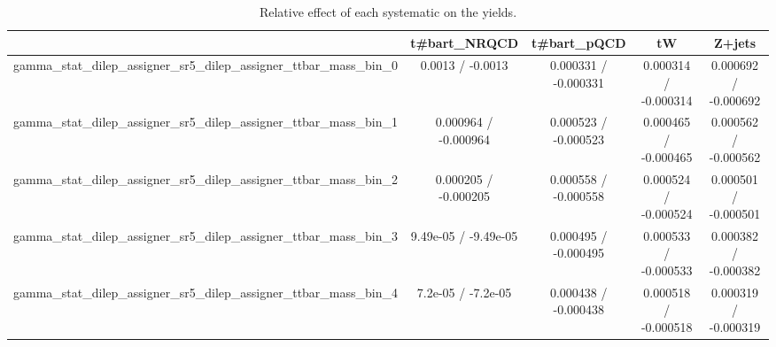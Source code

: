 \documentclass[10pt]{article}
\begin{document}
\begin{table}[htbp]
\begin{center}
\begin{tabular}{|c|c|c|c|c|}
\hline 
      & t#bar{t}_{NRQCD}      & t#bar{t}_{pQCD}      & tW      & Z+jets \\ 
\hline 
  gamma_stat_dilep_assigner_sr5_dilep_assigner_ttbar_mass_bin_0 & 0.0013 / -0.0013 & 0.000331 / -0.000331 & 0.000314 / -0.000314 & 0.000692 / -0.000692 \\ 
  gamma_stat_dilep_assigner_sr5_dilep_assigner_ttbar_mass_bin_1 & 0.000964 / -0.000964 & 0.000523 / -0.000523 & 0.000465 / -0.000465 & 0.000562 / -0.000562 \\ 
  gamma_stat_dilep_assigner_sr5_dilep_assigner_ttbar_mass_bin_2 & 0.000205 / -0.000205 & 0.000558 / -0.000558 & 0.000524 / -0.000524 & 0.000501 / -0.000501 \\ 
  gamma_stat_dilep_assigner_sr5_dilep_assigner_ttbar_mass_bin_3 & 9.49e-05 / -9.49e-05 & 0.000495 / -0.000495 & 0.000533 / -0.000533 & 0.000382 / -0.000382 \\ 
  gamma_stat_dilep_assigner_sr5_dilep_assigner_ttbar_mass_bin_4 & 7.2e-05 / -7.2e-05 & 0.000438 / -0.000438 & 0.000518 / -0.000518 & 0.000319 / -0.000319 \\ 
\hline 
\end{tabular} 
\caption{Relative effect of each systematic on the yields.} 
\end{center} 
\end{table} 
\end{document}
